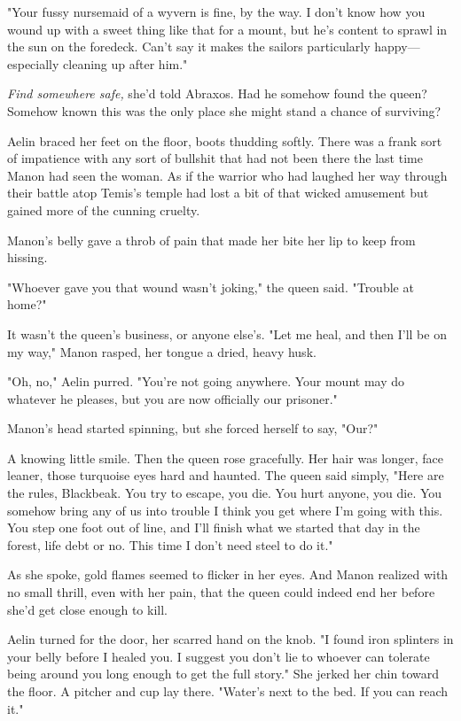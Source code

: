 "Your fussy nursemaid of a wyvern is fine, by the way.
I don't know how you wound up with a sweet thing like that for a mount, but he's content to sprawl in the sun on the foredeck.
Can't say it makes the sailors particularly happy--- especially cleaning up after him."

\emph{Find somewhere safe,} she'd told Abraxos.
Had he somehow found the queen?
Somehow known this was the only place she might stand a chance of surviving?

Aelin braced her feet on the floor, boots thudding softly.
There was a frank sort of impatience with any sort of bullshit that had not been there the last time Manon had seen the woman.
As if the warrior who had laughed her way through their battle atop Temis's temple had lost a bit of that wicked amusement but gained more of the cunning cruelty.

Manon's belly gave a throb of pain that made her bite her lip to keep from hissing.

"Whoever gave you that wound wasn't joking," the queen said.
"Trouble at home?"

It wasn't the queen's business, or anyone else's.
"Let me heal, and then I'll be on my way," Manon rasped, her tongue a dried, heavy husk.

"Oh, no," Aelin purred.
"You're not going anywhere.
Your mount may do whatever he pleases, but you are now officially our prisoner."

Manon's head started spinning, but she forced herself to say, "Our?"

A knowing little smile.
Then the queen rose gracefully.
Her hair was longer, face leaner, those turquoise eyes hard and haunted.
The queen said simply, "Here are the rules, Blackbeak.
You try to escape, you die.
You hurt anyone, you die.
You somehow bring any of us into trouble  I think you get where I'm going with this.
You step one foot out of line, and I'll finish what we started that day in the forest, life debt or no.
This time I don't need steel to do it."

As she spoke, gold flames seemed to flicker in her eyes.
And Manon realized with no small thrill, even with her pain, that the queen could indeed end her before she'd get close enough to kill.

Aelin turned for the door, her scarred hand on the knob.
"I found iron splinters in your belly before I healed you.
I suggest you don't lie to whoever can tolerate being around you long enough to get the full story."
She jerked her chin toward the floor.
A pitcher and cup lay there.
"Water's next to the bed.
If you can reach it."

